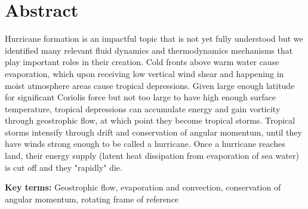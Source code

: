 \chapter{Abstract}
\begin{tcolorbox}[title=Abstract,colbacktitle=white!80!black,coltitle=black,arc=0mm,boxrule=0.1mm]
Hurricane formation is an impactful topic that is not yet fully understood but we identified many relevant fluid dynamics and thermodynamics mechanisms that play important roles in their creation. Cold fronts above warm water cause evaporation, which upon receiving low vertical wind shear and happening in moist atmosphere areas cause tropical depressions. Given large enough latitude for significant Coriolis force but not too large to have high enough surface temperature, tropical depressions can accumulate energy and gain vorticity through geostrophic flow, at which point they become tropical storms. Tropical storms intensify through drift and conservation of angular momentum, until they have winds strong enough to be called a hurricane. Once a hurricane reaches land, their energy supply (latent heat dissipation from evaporation of sea water) is cut off and they "rapidly" die.
\vspace{5mm}

\textbf{Key terms:} Geostrophic flow, evaporation and convection, conservation of angular momentum, rotating frame of reference
\end{tcolorbox}